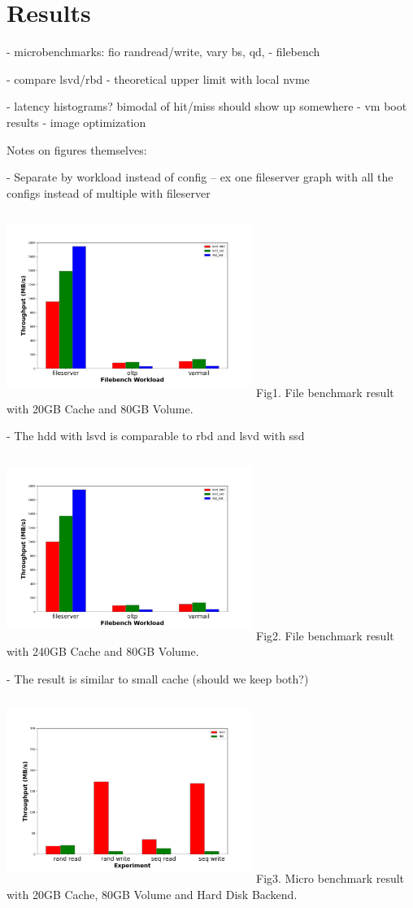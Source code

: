 \section{Results} \label{sec:results}

- microbenchmarks: fio randread/write, vary bs, qd, 
- filebench

- compare lsvd/rbd
- theoretical upper limit with local nvme

- latency histograms? bimodal of hit/miss should show up somewhere
- vm boot results
- image optimization

Notes on figures themselves:

- Separate by workload instead of config 
  -- ex one fileserver graph with all the configs instead of multiple with fileserver 


\includegraphics[width=8cm, height=6cm]{graphs/filebench_20g.png}
Fig1. File benchmark result with 20GB Cache and 80GB Volume. 

- The hdd with lsvd is comparable to rbd and lsvd with ssd


\includegraphics[width=8cm, height=6cm]{graphs/filebench_240g.png}
Fig2. File benchmark result with 240GB Cache and 80GB Volume.

- The result is similar to small cache (should we keep both?)

\includegraphics[width=8cm, height=6cm]{graphs/request_bw_hdd_20gb.png}
Fig3. Micro benchmark result with 20GB Cache, 80GB Volume and Hard Disk Backend.


